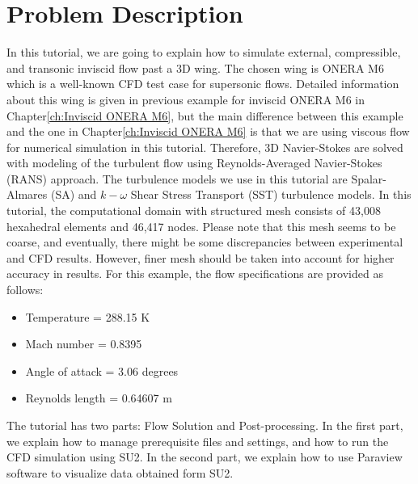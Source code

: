 \section{Problem Description}
In this tutorial, we are going to explain how to simulate external, compressible, and transonic inviscid flow past a 3D wing. The chosen wing is ONERA M6 which is a well-known CFD test case for supersonic flows. Detailed information about this wing is given in previous example for inviscid ONERA M6 in Chapter\ref{ch:Inviscid ONERA M6}, but the main difference between this example and the one in Chapter\ref{ch:Inviscid ONERA M6} is that we are using viscous flow for numerical simulation in this tutorial. Therefore, 3D Navier-Stokes are solved with modeling of the turbulent flow using Reynolds-Averaged Navier-Stokes (RANS) approach. The turbulence models we use in this tutorial are Spalar-Almares (SA) and $k-\omega$ Shear Stress Transport (SST) turbulence models. In this tutorial, the computational domain with structured mesh consists of 43,008 hexahedral elements and 46,417 nodes. Please note that this mesh seems to be coarse, and eventually, there might be some discrepancies between experimental and CFD results. However, finer mesh should be taken into account for higher accuracy in results. For this example, the flow specifications are provided as follows:
\begin{itemize}
    \item Temperature = 288.15 K
    \item Mach number = 0.8395
    \item Angle of attack = 3.06 degrees
    \item Reynolds length = 0.64607 m
\end{itemize}
The tutorial has two parts: Flow Solution and Post-processing. In the first part, we explain how to manage prerequisite files and settings, and how to run the CFD simulation using SU2. In the second part, we explain how to use Paraview software to visualize data obtained form SU2.
